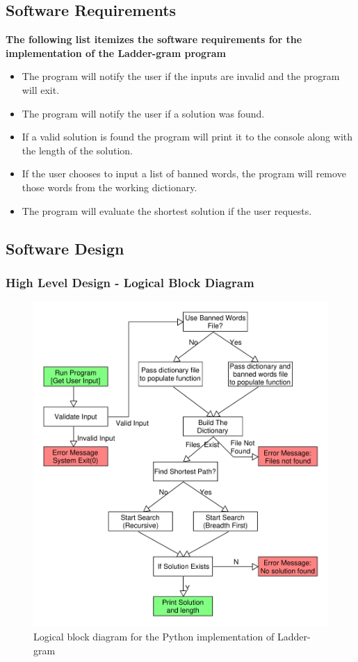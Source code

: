 \documentclass[12pt, a4]{report}
\begin{document}
\subsection{Software Requirements}
	\textbf{The following list itemizes the software requirements for the implementation of the Ladder-gram program}
	\begin{itemize}
		\item The program will notify the user if the inputs are invalid and the program will exit.
		\item The program will notify the user if a solution was found.
		\item If a valid solution is found the program will print it to the console along with the length of the solution.
		\item If the user chooses to input a list of banned words, the program will remove those words from the working dictionary. 
		\item The program will evaluate the shortest solution if the user requests.
	\end{itemize}
	\pagebreak
	
\subsection{Software Design}
	\subsubsection{High Level Design - Logical Block Diagram}

	\begin{figure}[!h]
	\centering
	\includegraphics[scale=0.6]{Logical_Block_Laddergram}
	\caption{Logical block diagram for the Python implementation of Ladder-gram}
	\end{figure}
				
\end{document}
